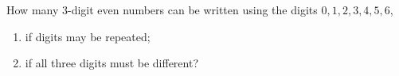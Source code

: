 How many $3$-digit even numbers can be written using the digits $0,1,2,3,4,5,6$,
\begin{enumerate}
\item[(i)] if digits may be repeated;
\item[(ii)] if all three digits must be different?
\end{enumerate}
